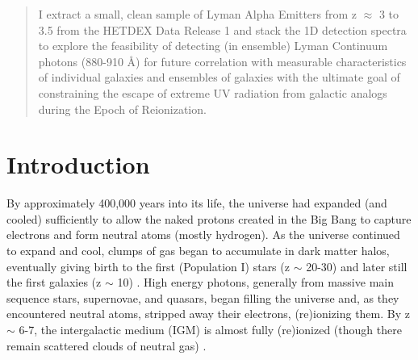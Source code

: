 \documentclass{aastex62}
\begin{document}

\author[0000-0002-8925-9769]{Dustin Davis}


\begin{abstract}

I extract a small, clean sample of Lyman Alpha Emitters from z $\approx$ 3 to 3.5 from the HETDEX Data Release 1 and stack the 1D detection spectra to explore the feasibility of detecting (in ensemble) Lyman Continuum photons (880-910 $\mbox{\AA}$) for future correlation with measurable characteristics of individual galaxies and ensembles of galaxies with the ultimate goal of constraining the escape of extreme UV radiation from galactic analogs during the Epoch of Reionization.

\end{abstract}




\section{Introduction} \label{sec:intro}

By approximately 400,000 years into its life, the universe had expanded (and cooled) sufficiently to allow the naked protons created in the Big Bang to capture electrons and form neutral atoms (mostly hydrogen). As the universe continued to expand and cool, clumps of gas began to accumulate in dark matter halos, eventually giving birth to the first (Population I) stars (z $\sim$ 20-30) and later still the first galaxies (z $\sim$ 10) \cite{Bromm}. High energy photons, generally from massive main sequence stars, supernovae, and quasars, began filling the universe and, as they encountered neutral atoms, stripped away their electrons, (re)ionizing them. By z $\sim$ 6-7, the intergalactic medium (IGM) is almost fully (re)ionized (though there remain scattered clouds of neutral gas) \cite{Stark}.\\
\end{document}
